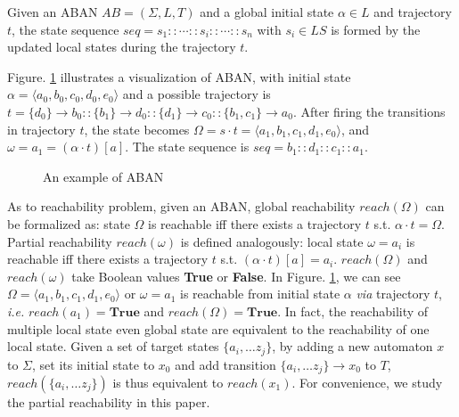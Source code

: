 \documentclass{entcs}
\newcommand{\acm}[3]{\{#1\}\rightarrow#2}
\begin{document}
\begin{definition}
Given an ABAN $AB = (\Sigma,L,T)$ and a global initial state $\alpha\in L$ and trajectory $t$, the state sequence $seq=s_1::\cdots :: s_i::\cdots ::s_n$ with $s_i\in LS$ is formed by the updated local states during the trajectory $t$.
\end{definition}


\begin{example}
    Figure. \ref{exampleABAN} illustrates a visualization of ABAN, with initial state $\alpha=\langle a_0,b_0,c_0,d_0,e_0\rangle$ and a possible trajectory is $t=\acm{d_0}{b_0}{b_1}::\acm{b_1}{d_0}{d_1}::\acm{d_1}{c_0}{c_1}::\acm{b_1,c_1}{a_0}{a_1}$.
    After firing the transitions in trajectory $t$, the state becomes $\Omega=s\cdot t=\langle a_1,b_1,c_1,d_1,e_0\rangle$, and $\omega= a_1= (\alpha\cdot t)[a]$. The state sequence is $seq=b_1::d_1::c_1::a_1$.
\end{example}

\begin{figure}[ht]
\centering

\caption{An example of ABAN}\label{exampleABAN}
\end{figure}
As to reachability problem, given an ABAN, global reachability $reach (\Omega)$ can be formalized as: state $\Omega$ is reachable iff there exists a trajectory $t$ s.t. $\alpha\cdot t=\Omega$.
Partial reachability $reach(\omega)$ is defined analogously: local state $\omega=a_i$ is reachable iff there exists a trajectory $t$ s.t. $(\alpha\cdot t)[a]=a_i$.
$reach (\Omega)$ and $reach(\omega)$ take Boolean values \textbf{True} or \textbf{False}.
In Figure. \ref{exampleABAN}, we can see $\Omega=\langle a_1,b_1,c_1,d_1,e_0\rangle$ or $\omega=a_1$ is reachable from initial state $\alpha$ \textit{via} trajectory $t$, \textit{i.e.} $reach(a_1)=\textbf{True}$ and $reach(\Omega)=\textbf{True}$. 
In fact, the reachability of multiple local state even global state are equivalent to the reachability of one local state. 
Given a set of target states $\{a_i,\ldots z_j\}$, by adding a new automaton $x$ to $\Sigma$, set its initial state to $x_0$ and add transition $\acm{a_i,\ldots z_j}{x_0}{x_1}$ to $T$, $reach(\{a_i,\ldots z_j\})$ is thus equivalent to $reach(x_1)$. For convenience, we study the partial reachability in this paper.
\end{document}
